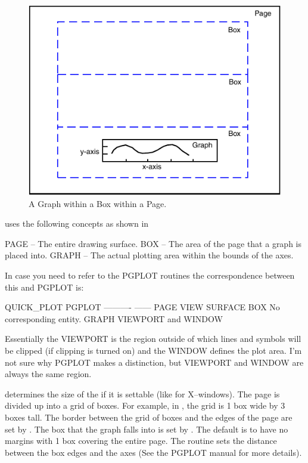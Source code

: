 \begin{figure}
  \centering
  \includegraphics{plot-coords.pdf}
  \caption{A Graph within a Box within a Page.}
  \label{f:plot.coords}
\end{figure}

\quickplot uses the following concepts as shown in 
\begin{example}
  PAGE  -- The entire drawing surface.
  BOX   -- The area of the page that a graph is placed into.
  GRAPH -- The actual plotting area within the bounds of the axes.
\end{example}
In case you need to refer to the PGPLOT routines the correspondence
between this and PGPLOT is:
\begin{example}
  QUICK_PLOT    PGPLOT
  ----------    ------
  PAGE          VIEW SURFACE
  BOX           No corresponding entity.
  GRAPH         VIEWPORT and WINDOW
\end{example}
Essentially the VIEWPORT is the region outside of which lines and symbols
will be clipped (if clipping is turned on) and the WINDOW defines the
plot area. I'm not sure why PGPLOT makes a distinction, but VIEWPORT and
WINDOW are always the same region.

 determines the size of the  if it is
settable (like for X--windows). The page is divided up into a grid of
boxes. For example, in , the grid is 1 box
wide by 3 boxes tall. The border between the grid of boxes and the
edges of the page are set by .  The box that
the graph falls into is set by . The default is to
have no margins with 1 box covering the entire page. The
 routine sets the distance between the box edges
and the axes (See the PGPLOT manual for more details).


